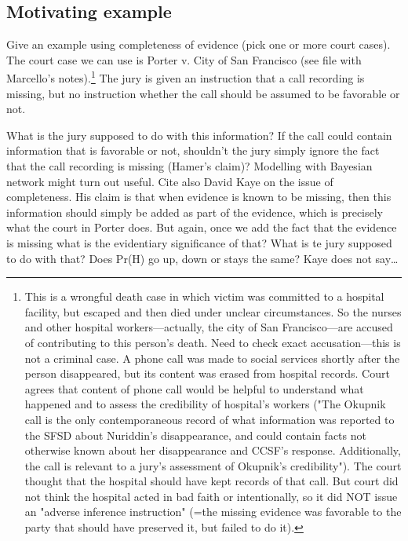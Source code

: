 \documentclass[
  10pt,
  dvipsnames,enabledeprecatedfontcommands]{scrartcl}
\begin{document}
\hypertarget{motivating-example}{%
\subsection{Motivating example}\label{motivating-example}}

Give an example using completeness of evidence (pick one or more court
cases). The court case we can use is Porter v. City of San Francisco
(see file with Marcello's
notes).\footnote{This is a wrongful death case in which victim was committed to a hospital facility, but escaped and then died under unclear circumstances. So the nurses and other hospital workers---actually, the city of San Francisco---are accused of contributing to this person's death. Need to check exact accusation---this is not a criminal case. A phone call was made to social services shortly after the person disappeared, but its content was erased from hospital records. Court agrees that content of phone call would be helpful to understand what happened and to assess the credibility of hospital's workers ("The Okupnik call is the only contemporaneous record of what information was reported to the SFSD about Nuriddin’s disappearance, and could contain facts not otherwise known about her disappearance and CCSF’s response. Additionally, the call is relevant to a jury’s assessment of Okupnik’s credibility"). The court thought that the hospital should have kept records of that call. But court did not think the hospital acted in bad faith or intentionally, so it did NOT issue an "adverse inference instruction" (=the missing evidence was favorable to the party that should have preserved it, but failed to do it).}
The jury is given an instruction that a call recording is missing, but
no instruction whether the call should be assumed to be favorable or
not.

What is the jury supposed to do with this information? If the call could
contain information that is favorable or not, shouldn't the jury simply
ignore the fact that the call recording is missing (Hamer's claim)?
Modelling with Bayesian network might turn out useful. Cite also David
Kaye on the issue of completeness. His claim is that when evidence is
known to be missing, then this information should simply be added as
part of the evidence, which is precisely what the court in Porter does.
But again, once we add the fact that the evidence is missing what is the
evidentiary significance of that? What is te jury supposed to do with
that? Does Pr(H) go up, down or stays the same? Kaye does not
say\ldots{}
\end{document}

